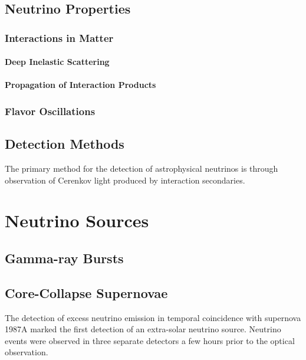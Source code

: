 \documentclass{gatech-thesis}
\begin{document}
\section{Neutrino Properties}



\subsection{Interactions in Matter}

\subsubsection{Deep Inelastic Scattering}

\subsubsection{Propagation of Interaction Products}

\subsection{Flavor Oscillations}



\section{Detection Methods}

The primary method for the detection of astrophysical neutrinos is through observation of Cerenkov light produced by interaction secondaries.

\chapter{Neutrino Sources}

\section{Gamma-ray Bursts}


\section{Core-Collapse Supernovae}
The detection of excess neutrino emission in temporal coincidence with supernova 1987A marked the first detection of an extra-solar neutrino source. Neutrino events were observed in three separate detectors a few hours prior to the optical observation. 
\end{document}
